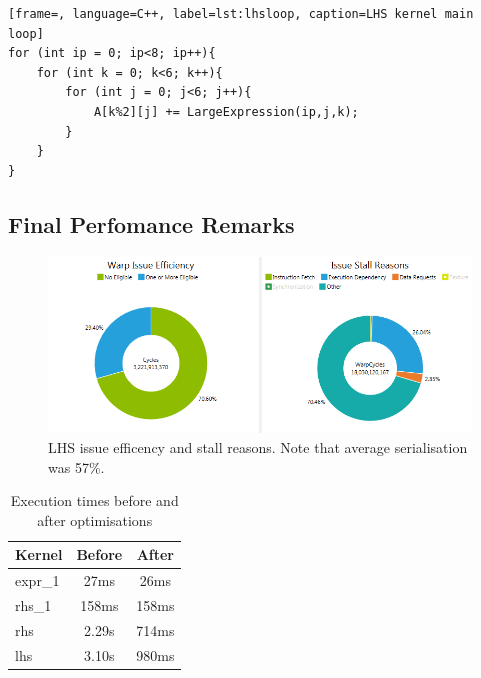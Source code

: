 \documentclass[11pt, oneside, a4paper]{article}
\begin{document}
\begin{lstlisting}[frame=, language=C++, label=lst:lhsloop, caption=LHS kernel main loop]
for (int ip = 0; ip<8; ip++){
	for (int k = 0; k<6; k++){
		for (int j = 0; j<6; j++){
			A[k%2][j] += LargeExpression(ip,j,k);
		}
	}
}
\end{lstlisting}


\subsection{Final Perfomance Remarks} %
\label{sub:final_performance_remarks}

\begin{figure}[tb]
	\begin{center}
		\includegraphics[width=\textwidth]{"LHS efficency and stall reason"}
	\end{center}
	\caption{LHS issue efficency and stall reasons. Note that average serialisation was 57\%.}
	\label{fig:issue_eff_and_stall_reasons}
\end{figure}

\begin{table}[tb]
	\caption{Execution times before and after optimisations}
	\label{tab:exetimes}
	\begin{center}
		\begin{tabular}{l|cc}
		\hline

		\hline
		\textbf{Kernel} & \textbf{Before} & \textbf{After} \\
		\hline
			expr\_1 & 27ms & 26ms \\
			rhs\_1 & 158ms & 158ms \\
			rhs & 2.29s & 714ms \\
			lhs & 3.10s & 980ms \\
		\hline

		\hline
		\end{tabular}
	\end{center}
\end{table}
\end{document}

